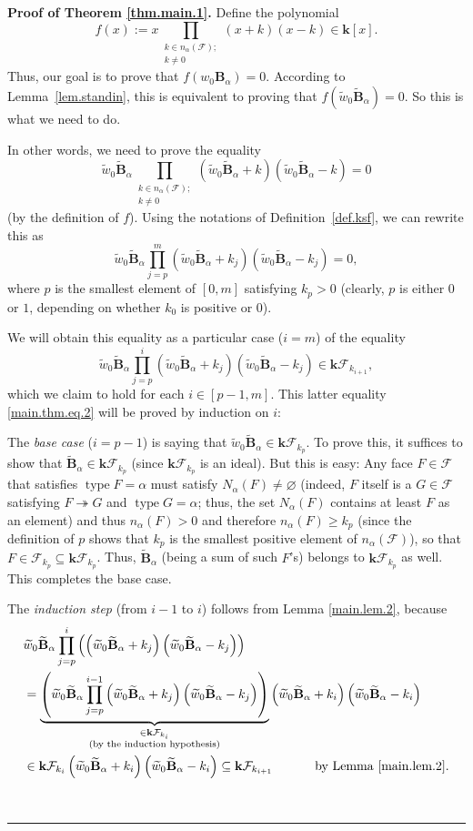 \documentclass[12pt]{article}
\theoremstyle{definition}%
\theoremstyle{definition}%
\theoremstyle{remark}%
\newcommand{\tup}[1]{\left( #1 \right)}
\newcommand{\sbr}[1]{\left[ #1 \right]} %
\newcommand{\interval}[1]{\left[ #1 \right]} %
\newcommand{\kk}{\mathbf{k}}
\newcommand{\kf}{\kk\mathcal{F}}
\newcommand{\BBa}{\mathbf{B}_{\alpha}}
\newcommand{\BBta}{\widetilde{\mathbf{B}}_{\alpha}}
\newcommand{\CF}{\mathcal{F}}
\newcommand{\wo}{w_0} %
\newcommand{\wotil}{\widetilde{w}_0}
\newcommand{\na}{n_{ \alpha } }%
\newcommand{\Na}{N_{ \alpha } }%
\newcommand{\type}{\operatorname{type}}
\newcommand{\con}{\twoheadrightarrow} %
\newenvironment{proof}[1][Proof]{\noindent\textbf{#1.} }{\ \rule{0.5em}{0.5em}}
\begin{document}
\begin{proof}[Proof of Theorem \ref{thm.main.1}]
Define the polynomial
\[
f\tup{x}
:= x \prod_{\substack{k \in \na\tup{\CF}; \\ k \ne 0}}\tup{x + k}\tup{x - k}
\in \kk\sbr{x}.
\]
Thus, our goal is to prove that $f\tup{\wo\BBa} = 0$.
According to Lemma~\ref{lem.standin}, this is
equivalent to proving that $f\tup{\wotil \BBta} = 0$.
So this is what we need to do.

In other words, we need to prove the equality
\[
\wotil\BBta\prod_{\substack{k \in \na\tup{\CF}; \\ k \ne 0}}\tup{\wotil\BBta + k}\tup{\wotil\BBta - k} = 0
\]
(by the definition of $f$).
Using the notations of Definition~\ref{def.ksf}, we can rewrite this as
\begin{equation}
\wotil\BBta\prod_{j=p}^{m}
\tup{ \wotil\BBta+k_{j} } \tup{ \wotil\BBta-k_{j} }
= 0,
\label{main.thm.eq.1}
\end{equation}
where $p$ is the smallest element of $\interval{0, m}$ satisfying $k_p > 0$ (clearly, $p$ is either $0$ or $1$, depending on whether $k_0$ is positive or $0$).

We will obtain this equality as a particular case ($i=m$) of the equality
\begin{equation}
\wotil\BBta
\prod_{j=p}^{i} \tup{ \wotil\BBta + k_{j} }
\tup{ \wotil\BBta - k_{j} }  \in \kf_{k_{i+1}},
\label{main.thm.eq.2}
\end{equation}
which we claim to hold for each $i\in \interval{p-1,m}$.
This latter equality \eqref{main.thm.eq.2} will be proved by induction
on $i$:

The \textit{base case} ($i=p-1$) is saying that $\wotil\BBta\in
\kf_{k_p}$. To prove this, it suffices to show that
$\BBta\in\kf_{k_p}$
(since $\kf_{k_p}$ is an ideal).
But this is easy: Any face $F\in\CF$ that satisfies
$\type F = \alpha$
must satisfy $\Na\tup{F} \neq \varnothing$ (indeed, $F$ itself is a
$G\in\CF$ satisfying $F\con G$ and $\type G = \alpha$;
thus, the set $\Na\tup{F}$ contains at least $F$
as an element) and thus $\na\tup{F} > 0$ and therefore
$\na\tup{F} \geq k_p$
(since the definition of $p$ shows that $k_p$ is the smallest
positive element of $\na\tup{\CF}$),
so that $F \in\CF_{k_p} \subseteq \kf_{k_p}$.
Thus, $\BBta$ (being a sum of such $F$'s) belongs to $\kf_{k_p}$
as well.
This completes the base case.

The \textit{induction step} (from $i-1$ to $i$) follows from Lemma
\ref{main.lem.2}, because
\begin{align*}
& \wotil\BBta\prod_{j=p}^{i} \tup{
\tup{ \wotil\BBta + k_j } \tup{ \wotil\BBta - k_j }
} \\
& =\underbrace{\tup{ \wotil\BBta\prod_{j=p}^{i-1}
\tup{ \wotil\BBta + k_j } \tup{ \wotil\BBta - k_j }
} }_{\substack{\in
\kf_{k_i}\\\text{(by the induction hypothesis)}}}
\tup{ \wotil\BBta + k_i } \tup{ \wotil\BBta - k_i } \\
& \in \kf_{k_i}
\tup{ \wotil\BBta + k_i } \tup{ \wotil\BBta - k_i }
\subseteq \kf_{k_{i+1}}
\ \ \ \ \ \ \ \ \ \ \text{by Lemma \ref{main.lem.2}.}
\end{align*}


\end{proof}
\end{document}
